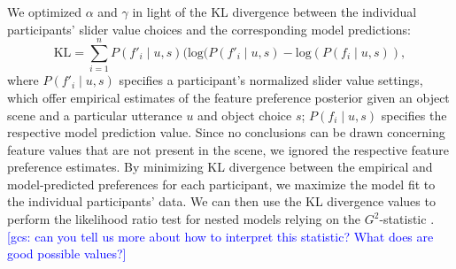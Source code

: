 \documentclass[10pt,a4paper]{article}
\newcommand{\gcs}[1]{\textcolor{blue}{[gcs: #1]}}
\begin{document}
We optimized $\alpha$ and $\gamma$ in light of the KL divergence between the individual participants' slider value choices and the corresponding model predictions:
$$\textrm{KL} = \sum_{i=1}^{n} P(f'_i\mid u,s) (\textrm {log} (P(f'_i\mid u,s) - \textrm {log} (P(f_i\mid u,s)),$$
where $P(f'_i\mid u,s)$ specifies a participant's normalized slider value settings, which offer empirical estimates of the feature preference posterior given an object scene and a particular utterance $u$ and object choice $s$; $P(f_i\mid u,s)$ specifies the respective model prediction value. 
Since no conclusions can be drawn concerning feature values that are not present in the scene, we ignored the respective feature preference estimates. By minimizing KL divergence between the empirical and model-predicted preferences for each participant, we maximize the model fit to the individual participants' data. We can then use the KL divergence values to perform the likelihood ratio test for nested models relying on the $G^2$-statistic \cite{Lewandowsky:2011}. \gcs{can you tell us more about how to interpret this statistic? What does are good possible values?}


\end{document}
